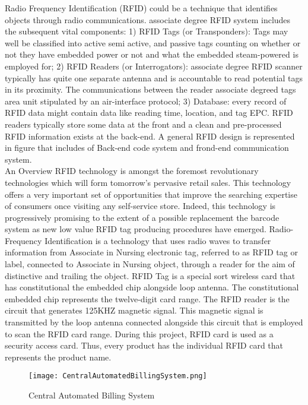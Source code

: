 \documentclass[12pt]{article}
\begin{document}
\hspace*{1 cm}Radio Frequency Identification (RFID) could be a technique that identifies objects through radio communications. associate degree RFID system includes the subsequent vital components: 1) RFID Tags (or Transponders): Tags may well be classified into active semi active, and passive tags counting on whether or not they have embedded power or not and what the embedded steam-powered is employed for; 2) RFID Readers (or Interrogators): associate degree RFID scanner typically has quite one separate antenna and is accountable to read potential tags in its proximity. The communications between the reader associate degreed tags area unit stipulated by an air-interface protocol; 3) Database: every record of RFID data might contain data like reading time, location, and tag EPC. RFID readers typically store some data at the front and a clean and pre-processed RFID information exists at the back-end. A general RFID design is represented in figure that includes of Back-end code system and frond-end communication system.\\
\hspace*{1 cm}An Overview RFID technology is amongst the foremost revolutionary technologies which will form tomorrow's pervasive retail sales. This technology offers a very important set of opportunities that improve the searching expertise of consumers once visiting any self-service store. Indeed, this technology is progressively promising to the extent of a possible replacement the barcode system as new low value RFID tag producing procedures have emerged. Radio-Frequency Identification is a technology that uses radio waves to transfer information from Associate in Nursing electronic tag, referred to as RFID tag or label, connected to Associate in Nursing object, through a reader for the aim of distinctive and trailing the object. RFID Tag is a special sort wireless card that has constitutional the embedded chip alongside loop antenna. The constitutional embedded chip represents the twelve-digit card range. The RFID reader is the circuit that generates 125KHZ magnetic signal. This magnetic signal is transmitted by the loop antenna connected alongside this circuit that is employed to scan the RFID card range. During this project, RFID card is used as a security access card. Thus, every product has the individual RFID card that represents the product name.
\begin{figure}[h]
\texttt{[image: CentralAutomatedBillingSystem.png]}
\centering
\caption{Central Automated Billing System}
\end{figure}\\
\end{document}

